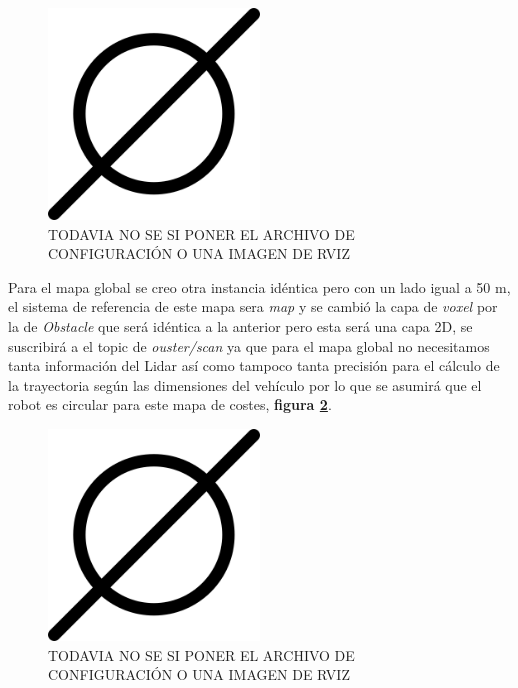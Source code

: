 \begin{figure}[H]
    \centering
    \includegraphics[width=0.5\textwidth]{images/poner_foto.png}
    \caption{TODAVIA NO SE SI PONER EL ARCHIVO DE CONFIGURACIÓN O UNA IMAGEN DE RVIZ}
    \label{fig:mapa_local}
\end{figure}

Para el mapa global se creo otra instancia idéntica pero con un lado igual a 50 m, el sistema de referencia de este mapa sera \textit{map} y se cambió 
la capa de \textit{voxel} por la de \textit{Obstacle} que será idéntica a la anterior pero esta será una capa 2D, se 
suscribirá a el topic de \textit{ouster/scan} ya que para el mapa global no necesitamos tanta información del Lidar así como tampoco tanta precisión para el 
cálculo de la trayectoria según las dimensiones del vehículo por lo que se asumirá que el robot es circular para este mapa de costes, \textbf{figura \ref{fig:mapa_global}}.

\begin{figure}[H]
    \centering
    \includegraphics[width=0.5\textwidth]{images/poner_foto.png}
    \caption{TODAVIA NO SE SI PONER EL ARCHIVO DE CONFIGURACIÓN O UNA IMAGEN DE RVIZ}
    \label{fig:mapa_global}
\end{figure}

